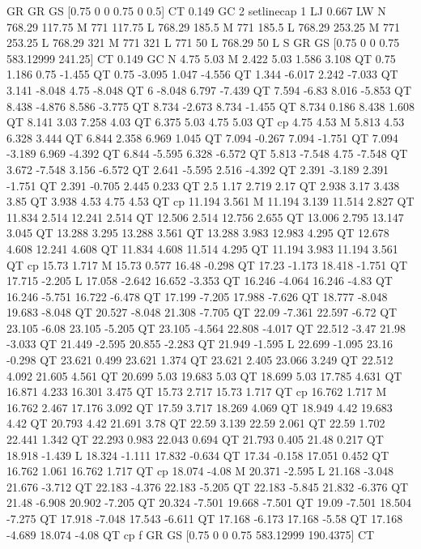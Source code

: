 GR
GR
GS
[0.75 0 0 0.75 0 0.5] CT
0.149 GC
2 setlinecap
1 LJ
0.667 LW
N
768.29 117.75 M
771 117.75 L
768.29 185.5 M
771 185.5 L
768.29 253.25 M
771 253.25 L
768.29 321 M
771 321 L
771 50 L
768.29 50 L
S
GR
GS
[0.75 0 0 0.75 583.12999 241.25] CT
0.149 GC
N
4.75 5.03 M
2.422 5.03 1.586 3.108 QT
0.75 1.186 0.75 -1.455 QT
0.75 -3.095 1.047 -4.556 QT
1.344 -6.017 2.242 -7.033 QT
3.141 -8.048 4.75 -8.048 QT
6 -8.048 6.797 -7.439 QT
7.594 -6.83 8.016 -5.853 QT
8.438 -4.876 8.586 -3.775 QT
8.734 -2.673 8.734 -1.455 QT
8.734 0.186 8.438 1.608 QT
8.141 3.03 7.258 4.03 QT
6.375 5.03 4.75 5.03 QT
cp
4.75 4.53 M
5.813 4.53 6.328 3.444 QT
6.844 2.358 6.969 1.045 QT
7.094 -0.267 7.094 -1.751 QT
7.094 -3.189 6.969 -4.392 QT
6.844 -5.595 6.328 -6.572 QT
5.813 -7.548 4.75 -7.548 QT
3.672 -7.548 3.156 -6.572 QT
2.641 -5.595 2.516 -4.392 QT
2.391 -3.189 2.391 -1.751 QT
2.391 -0.705 2.445 0.233 QT
2.5 1.17 2.719 2.17 QT
2.938 3.17 3.438 3.85 QT
3.938 4.53 4.75 4.53 QT
cp
11.194 3.561 M
11.194 3.139 11.514 2.827 QT
11.834 2.514 12.241 2.514 QT
12.506 2.514 12.756 2.655 QT
13.006 2.795 13.147 3.045 QT
13.288 3.295 13.288 3.561 QT
13.288 3.983 12.983 4.295 QT
12.678 4.608 12.241 4.608 QT
11.834 4.608 11.514 4.295 QT
11.194 3.983 11.194 3.561 QT
cp
15.73 1.717 M
15.73 0.577 16.48 -0.298 QT
17.23 -1.173 18.418 -1.751 QT
17.715 -2.205 L
17.058 -2.642 16.652 -3.353 QT
16.246 -4.064 16.246 -4.83 QT
16.246 -5.751 16.722 -6.478 QT
17.199 -7.205 17.988 -7.626 QT
18.777 -8.048 19.683 -8.048 QT
20.527 -8.048 21.308 -7.705 QT
22.09 -7.361 22.597 -6.72 QT
23.105 -6.08 23.105 -5.205 QT
23.105 -4.564 22.808 -4.017 QT
22.512 -3.47 21.98 -3.033 QT
21.449 -2.595 20.855 -2.283 QT
21.949 -1.595 L
22.699 -1.095 23.16 -0.298 QT
23.621 0.499 23.621 1.374 QT
23.621 2.405 23.066 3.249 QT
22.512 4.092 21.605 4.561 QT
20.699 5.03 19.683 5.03 QT
18.699 5.03 17.785 4.631 QT
16.871 4.233 16.301 3.475 QT
15.73 2.717 15.73 1.717 QT
cp
16.762 1.717 M
16.762 2.467 17.176 3.092 QT
17.59 3.717 18.269 4.069 QT
18.949 4.42 19.683 4.42 QT
20.793 4.42 21.691 3.78 QT
22.59 3.139 22.59 2.061 QT
22.59 1.702 22.441 1.342 QT
22.293 0.983 22.043 0.694 QT
21.793 0.405 21.48 0.217 QT
18.918 -1.439 L
18.324 -1.111 17.832 -0.634 QT
17.34 -0.158 17.051 0.452 QT
16.762 1.061 16.762 1.717 QT
cp
18.074 -4.08 M
20.371 -2.595 L
21.168 -3.048 21.676 -3.712 QT
22.183 -4.376 22.183 -5.205 QT
22.183 -5.845 21.832 -6.376 QT
21.48 -6.908 20.902 -7.205 QT
20.324 -7.501 19.668 -7.501 QT
19.09 -7.501 18.504 -7.275 QT
17.918 -7.048 17.543 -6.611 QT
17.168 -6.173 17.168 -5.58 QT
17.168 -4.689 18.074 -4.08 QT
cp
f
GR
GS
[0.75 0 0 0.75 583.12999 190.4375] CT
